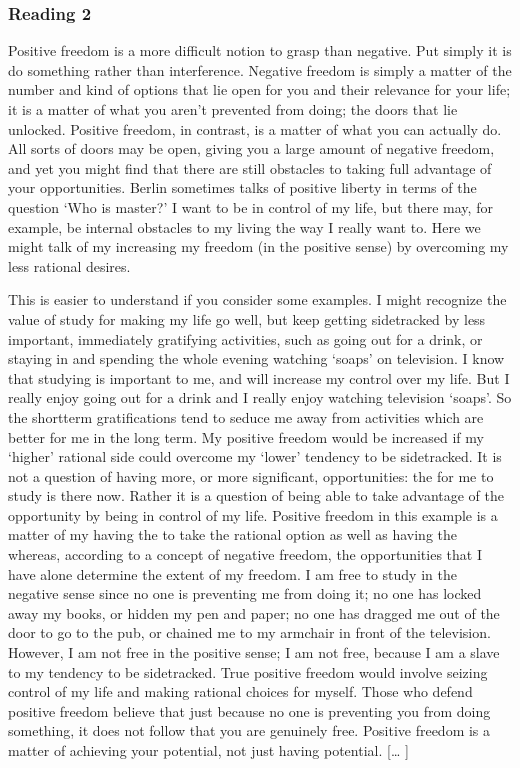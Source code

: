 \documentclass[letterpaper,10pt,english]{sphinxmanual}
\begin{document}
\subsubsection{Reading 2}
\label{\detokenize{content/session_00/Part_00_02:Reading-2}}
Positive freedom is a more difficult notion to grasp than negative. Put simply it is  do something rather than  interference. Negative freedom is simply a matter of the number and kind of options that lie open for you and their relevance for your life; it is a matter of what you aren’t prevented from doing; the doors that lie unlocked. Positive freedom, in contrast, is a matter of what you can actually do. All sorts of doors may be open, giving you a large amount of
negative freedom, and yet you might find that there are still obstacles to taking full advantage of your opportunities. Berlin sometimes talks of positive liberty in terms of the question ‘Who is master?’ I want to be in control of my life, but there may, for example, be internal obstacles to my living the way I really want to. Here we might talk of my increasing my freedom (in the positive sense) by overcoming my less rational desires.

This is easier to understand if you consider some examples. I might recognize the value of study for making my life go well, but keep getting sidetracked by less important, immediately gratifying activities, such as going out for a drink, or staying in and spending the whole evening watching ‘soaps’ on television. I know that studying is important to me, and will increase my control over my life. But I really enjoy going out for a drink and I really enjoy watching television ‘soaps’. So the
short\sphinxhyphen{}term gratifications tend to seduce me away from activities which are better for me in the long term. My positive freedom would be increased if my ‘higher’ rational side could overcome my ‘lower’ tendency to be sidetracked. It is not a question of having more, or more significant, opportunities: the  for me to study is there now. Rather it is a question of being able to take advantage of the opportunity by being in control of my life. Positive freedom in this example is a
matter of my having the  to take the rational option as well as having the  whereas, according to a concept of negative freedom, the opportunities that I have alone determine the extent of my freedom. I am free to study in the negative sense since no one is preventing me from doing it; no one has locked away my books, or hidden my pen and paper; no one has dragged me out of the door to go to the pub, or chained me to my armchair in front of the television. However, I am
not free in the positive sense; I am not  free, because I am a slave to my tendency to be sidetracked. True positive freedom would involve seizing control of my life and making rational choices for myself. Those who defend positive freedom believe that just because no one is preventing you from doing something, it does not follow that you are genuinely free. Positive freedom is a matter of achieving your potential, not just having potential. {[}… {]}
\end{document}
